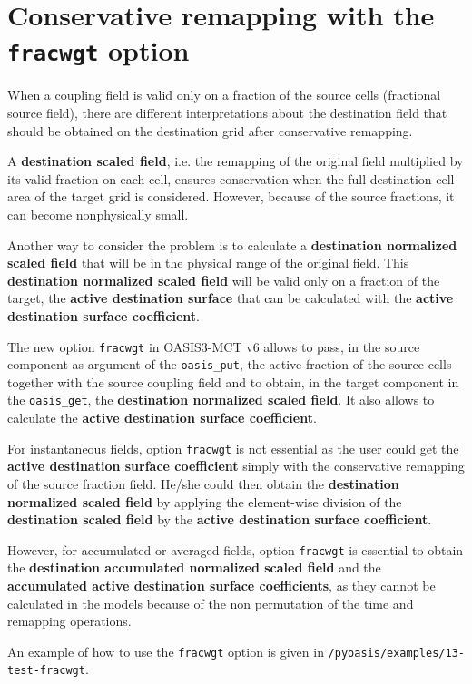 \newpage
\appendix
\chapter{Conservative remapping with the {\tt fracwgt} option}
\label{subsec_fracwgt}

When a coupling field is valid only on a fraction of the source cells (fractional source field), there are different interpretations about the destination field that should be obtained on the destination grid after conservative remapping. 

A {\bf destination scaled field}, i.e. the remapping of the original field multiplied by its valid fraction on each cell, ensures conservation when the full destination cell area of the target grid is considered. However, because of the source fractions, it can become nonphysically small. 

Another way to consider the problem is to calculate a {\bf destination normalized scaled field} that will be in the physical range of the original field. This {\bf destination normalized scaled field} will be valid only on a fraction of the target, the {\bf active destination surface} that can be calculated with the {\bf active destination surface coefficient}.

The new option {\tt fracwgt} in OASIS3-MCT v6 allows to pass, in the source component as argument of the {\tt oasis\_put}, the active fraction of the source cells together with the source coupling field and to obtain, in the target component in the {\tt oasis\_get}, the {\bf destination normalized scaled field}. It also allows to calculate the {\bf active destination surface coefficient}.

For instantaneous fields, option {\tt fracwgt} is not essential as the user could get the {\bf active destination surface coefficient} simply with the conservative remapping of the source fraction field. He/she could then obtain the {\bf destination normalized scaled field} by applying the element-wise division of the {\bf destination scaled field} by the {\bf active destination surface coefficient}.

However, for accumulated or averaged fields, option {\tt fracwgt} is essential to obtain the {\bf destination accumulated
normalized scaled field} and the {\bf accumulated active destination surface coefficients}, as they cannot be calculated in the  models because of the non permutation of the time and remapping operations. 

An example of how to use the {\tt fracwgt} option is given in  {\tt /pyoasis/examples/13-test-fracwgt}. 
